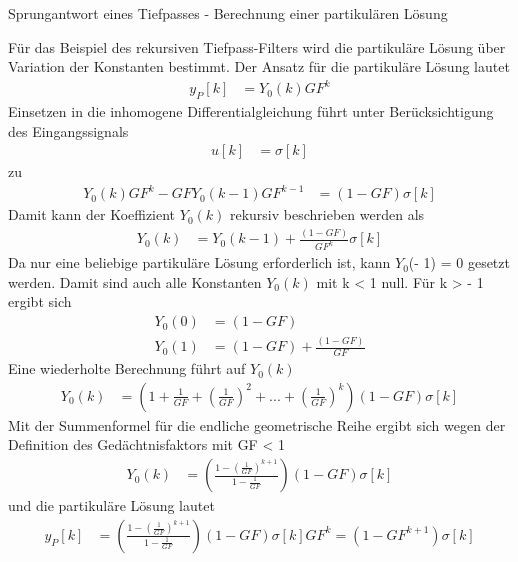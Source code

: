 \begin{example}{Sprungantwort eines Tiefpasses - Berechnung einer partikulären Lösung}
\label{example:beispiel-sprungantwort-eines-tiefpasses---berechnung-einer-partikuluxe4ren-luxf6sung}

Für das Beispiel des rekursiven Tiefpass-Filters wird die partikuläre Lösung über Variation der Konstanten bestimmt. Der Ansatz für die partikuläre Lösung lautet
\begin{align*}
y_{P}[ k] &= Y_{0}(k)  GF^{k} 
\end{align*}
Einsetzen in die inhomogene Differentialgleichung führt unter Berücksichtigung des Eingangssignals
\begin{align*}
u[ k] &= \sigma[ k] 
\end{align*}
zu
\begin{align*}
Y_{0}(k)  GF^{k} - GF  Y_{0}(k - 1)  GF^{k - 1} &= (1 - GF)  \sigma[ k] 
\end{align*}
Damit kann der Koeffizient \(Y_{0}(k)\) rekursiv beschrieben werden als
\begin{align*}
Y_{0}(k) &= Y_{0}(k - 1) + \frac{(1 - GF)}{GF^{k}}  \sigma[ k] 
\end{align*}
Da nur eine beliebige partikuläre Lösung erforderlich ist, kann \(Y_{0}\)(- 1) = 0 gesetzt werden. Damit sind auch alle Konstanten \(Y_{0}(k)\) mit k \textless{} 1 null. Für k \textgreater{} - 1 ergibt sich
\begin{align*}
Y_{0}(0) &= (1 - GF)  \\
Y_{0}(1) &= (1 - GF) + \frac{(1 - GF)}{GF} 
\end{align*}
Eine wiederholte Berechnung führt auf \(Y_{0}(k)\)
\begin{align*}
Y_{0}(k) &= \left( 1 + \frac{1}{GF} + \left( \frac{1}{GF} \right)^{2} + ... + \left( \frac{1}{GF} \right)^{k} \right)  (1 - GF)  \sigma[ k] 
\end{align*}
Mit der Summenformel für die endliche geometrische Reihe ergibt sich wegen der Definition des Gedächtnisfaktors mit \textbar GF\textbar{} \textless{} 1
\begin{align*}
Y_{0}(k) &= \left( \frac{1 - \left( \frac{1}{GF} \right)^{k + 1}}{1 - \frac{1}{GF}} \right)  (1 - GF)  \sigma[ k] 
\end{align*}
und die partikuläre Lösung lautet
\begin{align*}
y_{P}[ k] &= \left( \frac{1 - \left( \frac{1}{GF} \right)^{k + 1}}{1 - \frac{1}{GF}} \right)  (1 - GF)  \sigma[ k]  GF^{k} = \left( 1 - GF^{k + 1} \right)  \sigma[ k] 
\end{align*}
\end{example}

